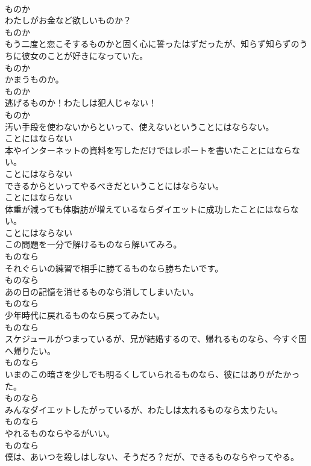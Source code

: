 \documentclass[8pt]{extreport}
\begin{document}
\begin{CJK}{UTF8}{min}
\\	ものか
\\	わたしがお金など欲しいものか？	
\\	ものか
\\	もう二度と恋こそするものかと固く心に誓ったはずだったが、知らず知らずのうちに彼女のことが好きになっていた。	
\\	ものか
\\	かまうものか。	
\\	ものか
\\	逃げるものか！わたしは犯人じゃない！	
\\	ものか
\\	汚い手段を使わないからといって、使えないということにはならない。	
\\	ことにはならない
\\	本やインターネットの資料を写しただけではレポートを書いたことにはならない。	
\\	ことにはならない
\\	できるからといってやるべきだということにはならない。	
\\	ことにはならない
\\	体重が減っても体脂肪が増えているならダイエットに成功したことにはならない。	
\\	ことにはならない
\\	この問題を一分で解けるものなら解いてみろ。	
\\	ものなら
\\	それぐらいの練習で相手に勝てるものなら勝ちたいです。	
\\	ものなら
\\	あの日の記憶を消せるものなら消してしまいたい。	
\\	ものなら
\\	少年時代に戻れるものなら戻ってみたい。	
\\	ものなら
\\	スケジュールがつまっているが、兄が結婚するので、帰れるものなら、今すぐ国へ帰りたい。	
\\	ものなら
\\	いまのこの暗さを少しでも明るくしていられるものなら、彼にはありがたかった。	
\\	ものなら
\\	みんなダイエットしたがっているが、わたしは太れるものなら太りたい。	
\\	ものなら
\\	やれるものならやるがいい。	
\\	ものなら
\\	僕は、あいつを殺しはしない、そうだろ？だが、できるものならやってやる。	

\end{CJK}
\end{document}
